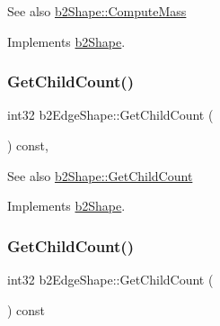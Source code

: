 \begin{DoxySeeAlso}{See also}
\hyperlink{classb2Shape_a61b365526241b47f124789b0309cac69}{b2\+Shape\+::\+Compute\+Mass} 
\end{DoxySeeAlso}


Implements \hyperlink{classb2Shape_a61b365526241b47f124789b0309cac69}{b2\+Shape}.

\mbox{\label{classb2EdgeShape_ae9dcaa2f4b77fcf182d29159658da82a}} 
\subsubsection{\texorpdfstring{Get\+Child\+Count()}{GetChildCount()}\hspace{0.1cm}{\footnotesize\ttfamily [1/2]}}
{\footnotesize\ttfamily int32 b2\+Edge\+Shape\+::\+Get\+Child\+Count (\begin{DoxyParamCaption}{ }\end{DoxyParamCaption}) const\hspace{0.3cm}{\ttfamily [override]}, {\ttfamily [virtual]}}

\begin{DoxySeeAlso}{See also}
\hyperlink{classb2Shape_a05a3c445017d96df9238ceefe6ce37ab}{b2\+Shape\+::\+Get\+Child\+Count} 
\end{DoxySeeAlso}


Implements \hyperlink{classb2Shape_a05a3c445017d96df9238ceefe6ce37ab}{b2\+Shape}.

\mbox{\label{classb2EdgeShape_ab675660fbb4a21dc5c89a97a5822f357}} 
\subsubsection{\texorpdfstring{Get\+Child\+Count()}{GetChildCount()}\hspace{0.1cm}{\footnotesize\ttfamily [2/2]}}
{\footnotesize\ttfamily int32 b2\+Edge\+Shape\+::\+Get\+Child\+Count (\begin{DoxyParamCaption}{ }\end{DoxyParamCaption}) const\hspace{0.3cm}{\ttfamily [virtual]}}

